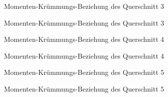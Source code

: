 \documentclass[
  11pt,
  letterpaper,
]{scrreprt}
\begin{document}
\begin{figure}[H]


\caption{\label{fig-qs_3}Momenten-Krümmungs-Beziehung des Querschnitt 3}

\end{figure}%

\begin{figure}[H]


\caption{\label{fig-m_chi_3}Momenten-Krümmungs-Beziehung des Querschnitt
3}

\end{figure}%

\begin{figure}[H]


\caption{\label{fig-qs_4}Momenten-Krümmungs-Beziehung des Querschnitt 4}

\end{figure}%

\begin{figure}[H]


\caption{\label{fig-m_chi_4}Momenten-Krümmungs-Beziehung des Querschnitt
4}

\end{figure}%

\begin{figure}[H]


\caption{\label{fig-qs_5}Momenten-Krümmungs-Beziehung des Querschnitt 5}

\end{figure}%

\begin{figure}[H]


\caption{\label{fig-m_chi_5}Momenten-Krümmungs-Beziehung des Querschnitt
5}

\end{figure}%
\end{document}
